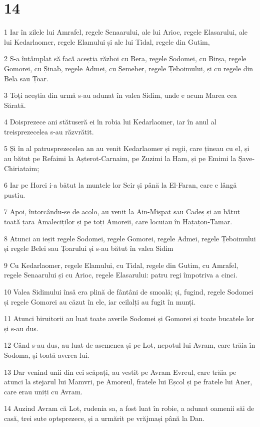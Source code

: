 \chapter{14}

\par 1 Iar în zilele lui Amrafel, regele Senaarului, ale lui Arioc, regele Elasarului, ale lui Kedarlaomer, regele Elamului și ale lui Tidal, regele din Gutim,
\par 2 S-a întâmplat să facă aceștia război cu Bera, regele Sodomei, cu Birșa, regele Gomorei, cu Șinab, regele Admei, cu Șemeber, regele Țeboimului, și cu regele din Bela sau Țoar.
\par 3 Toți aceștia din urmă s-au adunat în valea Sidim, unde e acum Marea cea Sărată.
\par 4 Doisprezece ani stătuseră ei în robia lui Kedarlaomer, iar în anul al treisprezecelea s-au răzvrătit.
\par 5 Și în al patrusprezecelea an au venit Kedarlaomer și regii, care țineau cu el, și au bătut pe Refaimi la Așterot-Carnaim, pe Zuzimi la Ham, și pe Emimi la Șave-Chiriataim;
\par 6 Iar pe Horei i-a bătut la muntele lor Seir și până la El-Faran, care e lângă pustiu.
\par 7 Apoi, întorcându-se de acolo, au venit la Ain-Mișpat sau Cadeș și au bătut toată țara Amaleciților și pe toți Amoreii, care locuiau în Hațațon-Tamar.
\par 8 Atunci au ieșit regele Sodomei, regele Gomorei, regele Admei, regele Țeboimului și regele Belei sau Țoarului și s-au bătut în valea Sidim
\par 9 Cu Kedarlaomer, regele Elamului, cu Tidal, regele din Gutim, cu Amrafel, regele Senaarului și cu Arioc, regele Elasarului: patru regi împotriva a cinci.
\par 10 Valea Sidimului însă era plină de fântâni de smoală; și, fugind, regele Sodomei și regele Gomorei au căzut în ele, iar ceilalți au fugit în munți.
\par 11 Atunci biruitorii au luat toate averile Sodomei și Gomorei și toate bucatele lor și s-au dus.
\par 12 Când s-au dus, au luat de asemenea și pe Lot, nepotul lui Avram, care trăia în Sodoma, și toată averea lui.
\par 13 Dar venind unii din cei scăpați, au vestit pe Avram Evreul, care trăia pe atunci la stejarul lui Mamvri, pe Amoreul, fratele lui Eșcol și pe fratele lui Aner, care erau uniți cu Avram.
\par 14 Auzind Avram că Lot, rudenia sa, a fost luat în robie, a adunat oamenii săi de casă, trei sute optsprezece, și a urmărit pe vrăjmași până la Dan.
